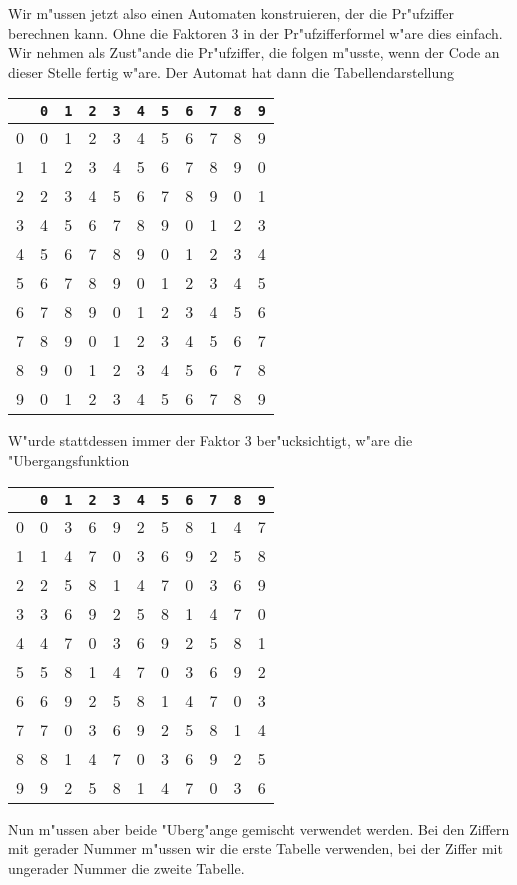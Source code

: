 \begin{loesung}
Wir m"ussen jetzt also einen Automaten konstruieren, der die
Pr"ufziffer berechnen kann.
Ohne die Faktoren $3$ in der Pr"ufzifferformel
w"are dies einfach. Wir nehmen als Zust"ande die Pr"ufziffer,
die folgen m"usste, wenn der Code an dieser Stelle fertig w"are.
Der Automat hat dann die Tabellendarstellung
\begin{center}
\begin{tabular}{|c|cccccccccc|}
\hline
&{\tt 0} &{\tt 1} &{\tt 2} &{\tt 3} &{\tt 4} &{\tt 5} &{\tt 6} &{\tt 7} &{\tt 8} &{\tt 9}\\
\hline
0&0&1&2&3&4&5&6&7&8&9\\
1&1&2&3&4&5&6&7&8&9&0\\
2&2&3&4&5&6&7&8&9&0&1\\
3&4&5&6&7&8&9&0&1&2&3\\
4&5&6&7&8&9&0&1&2&3&4\\
5&6&7&8&9&0&1&2&3&4&5\\
6&7&8&9&0&1&2&3&4&5&6\\
7&8&9&0&1&2&3&4&5&6&7\\
8&9&0&1&2&3&4&5&6&7&8\\
9&0&1&2&3&4&5&6&7&8&9\\
\hline
\end{tabular}
\end{center}
W"urde stattdessen immer der Faktor $3$ ber"ucksichtigt, w"are
die "Ubergangsfunktion
\begin{center}
\begin{tabular}{|c|cccccccccc|}
\hline
&{\tt 0} &{\tt 1} &{\tt 2} &{\tt 3} &{\tt 4} &{\tt 5} &{\tt 6} &{\tt 7} &{\tt 8} &{\tt 9}\\
\hline
0&0&3&6&9&2&5&8&1&4&7\\
1&1&4&7&0&3&6&9&2&5&8\\
2&2&5&8&1&4&7&0&3&6&9\\
3&3&6&9&2&5&8&1&4&7&0\\
4&4&7&0&3&6&9&2&5&8&1\\
5&5&8&1&4&7&0&3&6&9&2\\
6&6&9&2&5&8&1&4&7&0&3\\
7&7&0&3&6&9&2&5&8&1&4\\
8&8&1&4&7&0&3&6&9&2&5\\
9&9&2&5&8&1&4&7&0&3&6\\
\hline
\end{tabular}
\end{center}
Nun m"ussen aber beide "Uberg"ange gemischt verwendet werden.
Bei den Ziffern mit gerader Nummer m"ussen wir die erste Tabelle
verwenden, bei der Ziffer mit ungerader Nummer die zweite Tabelle.

\end{loesung}
